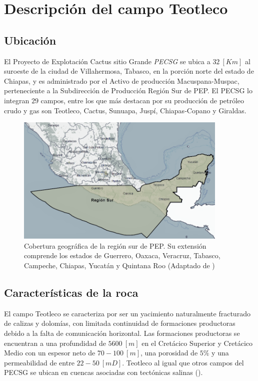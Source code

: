 \chapter{Descripción del campo Teotleco}
\label{chp:campo}


\section{Ubicación}
El Proyecto de Explotación Cactus sitio Grande \emph{PECSG} se ubica a $32~[Km]$ al suroeste de la ciudad de Villahermosa, Tabasco, en la porción norte del estado de Chiapas, y es administrado por el Activo de producción Macuspana-Muspac, perteneciente a la Subdirección de Producción Región Sur de PEP. El PECSG lo integran $29$ campos, entre los que más destacan por su producción de petróleo crudo y gas son Teotleco, Cactus, Sunuapa, Juspí, Chiapas-Copano y Giraldas. 

    \begin{figure}[h]
        \centering
        \includegraphics[width=0.9\textwidth]{Graphics/Region_Sur.png}
        \caption[Ubicación del Campo]{Cobertura geográfica de la región sur de PEP. Su extensión comprende los estados de Guerrero, Oaxaca, Veracruz, Tabasco, Campeche, Chiapas, Yucatán y Quintana Roo (Adaptado de \cite{PEMEX:2017})}
        \label{fig:PEPsur}
    \end{figure}


\section{Características de la roca}

El campo Teotleco se caracteriza por ser un yacimiento naturalmente fracturado de calizas y dolomías, con limitada continuidad de formaciones productoras debido a la falta de comunicación horizontal. Las formaciones productoras se encuentran a una profundidad de $5600~[m]$ en el Cretácico Superior y Cretácico Medio con un espesor neto de $70-100~[m]$, una porosidad de $5\%$ y una permeabilidad de entre $22-50~[mD]$. Teotleco al igual que otros campos del PECSG se ubican en cuencas asociadas con tectónicas salinas (\cite{PEMEX2012}).

